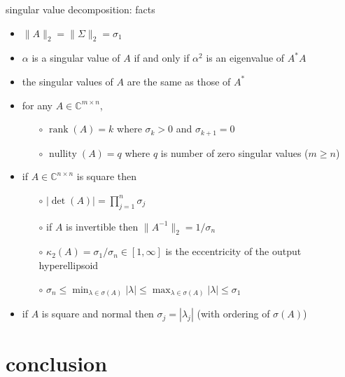 \documentclass[10pt,hyperref]{beamer}
\newcommand{\CC}{\mathbb{C}}
\newcommand{\rank}{\operatorname{rank}}
\begin{document}
\begin{frame}{singular value decomposition: facts}

\begin{itemize}
\item $\|A\|_2=\|\Sigma\|_2=\sigma_1$
\item $\alpha$ is a singular value of $A$ if and only if $\alpha^2$ is an eigenvalue of $A^*A$
\item the singular values of $A$ are the same as those of $A^*$
\item for any $A\in \CC^{m\times n}$,
    \begin{itemize}
    \item[$\circ$] $\rank(A)=k$ where $\sigma_k>0$ and $\sigma_{k+1}=0$
    \item[$\circ$] $\operatorname{nullity}(A)=q$ where $q$ is number of zero singular values ($m\ge n$)
    \end{itemize}
\item if $A\in \CC^{n\times n}$ is square then
    \begin{itemize}
    \item[$\circ$] $|\det(A)| = \prod_{j=1}^n \sigma_j$
    \item[$\circ$] if $A$ is invertible then $\|A^{-1}\|_2 = 1/\sigma_n$
    \item[$\circ$] $\kappa_2(A) = \sigma_1/\sigma_n \in [1,\infty]$ is the eccentricity of the output hyperellipsoid
    \item[$\circ$] $\sigma_n \le \min_{\lambda\in\sigma(A)} |\lambda| \le \max_{\lambda\in\sigma(A)} |\lambda| \le \sigma_1$
    \end{itemize}
\item if $A$ is square and normal then $\sigma_j = |\lambda_j|$ (with ordering of $\sigma(A)$)
\end{itemize}
\end{frame}


\section{conclusion}
\end{document}
